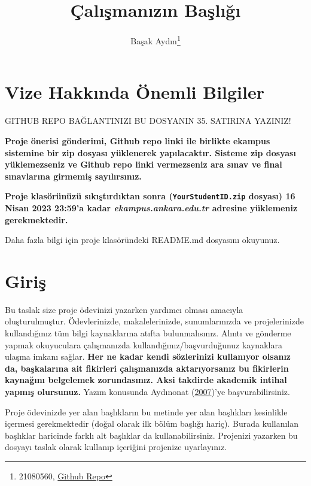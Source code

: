 \documentclass[
  12pt,
]{article}
\title{Çalışmanızın Başlığı}
\author{Başak Aydın\footnote{21080560, \href{https://github.com/basakaaydin/arasinavodevi}{Github Repo}}}
\date{}
\begin{document}
\maketitle

\hypertarget{vize-hakkux131nda-uxf6nemli-bilgiler}{%
\section{Vize Hakkında Önemli Bilgiler}\label{vize-hakkux131nda-uxf6nemli-bilgiler}}

\colorbox{BurntOrange}{GITHUB REPO BAĞLANTINIZI BU DOSYANIN 35. SATIRINA YAZINIZ!}

\textbf{Proje önerisi gönderimi, Github repo linki ile birlikte ekampus sistemine bir zip dosyası yüklenerek yapılacaktır. Sisteme zip dosyası yüklemezseniz ve Github repo linki vermezseniz ara sınav ve final sınavlarına girmemiş sayılırsınız.}

\textbf{Proje klasörünüzü sıkıştırdıktan sonra (\texttt{YourStudentID.zip} dosyası) 16 Nisan 2023 23:59'a kadar \emph{ekampus.ankara.edu.tr} adresine yüklemeniz gerekmektedir.}

\colorbox{WildStrawberry}{Daha fazla bilgi için proje klasöründeki README.md dosyasını okuyunuz.}

\hypertarget{giriux15f}{%
\section{Giriş}\label{giriux15f}}

Bu taslak size proje ödevinizi yazarken yardımcı olması amacıyla oluşturulmuştur. Ödevlerinizde, makalelerinizde, sunumlarınızda ve projelerinizde kullandığınız tüm bilgi kaynaklarına atıfta bulunmalısınız. Alıntı ve gönderme yapmak okuyuculara çalışmanızda kullandığınız/başvurduğunuz kaynaklara ulaşma imkanı sağlar. \textbf{Her ne kadar kendi sözlerinizi kullanıyor olsanız da, başkalarına ait fikirleri çalışmanızda aktarıyorsanız bu fikirlerin kaynağını belgelemek zorundasınız. Aksi takdirde akademik intihal yapmış olursunuz.} Yazım konusunda Aydınonat (\protect\hyperlink{ref-aydinonat:2007}{2007})'ye başvurabilirsiniz.

Proje ödevinizde yer alan başlıkların bu metinde yer alan başlıkları kesinlikle içermesi gerekmektedir (doğal olarak ilk bölüm başlığı hariç). Burada kullanılan başlıklar haricinde farklı alt başlıklar da kullanabilirsiniz. Projenizi yazarken bu dosyayı taslak olarak kullanıp içeriğini projenize uyarlayınız.
\end{document}
